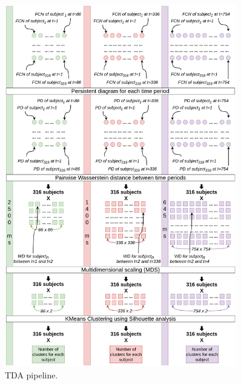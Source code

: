 \begin{figure}[H]%
	\centering	
	\includegraphics[width=0.9\textwidth, trim={0cm, 0.0cm, 0.0cm, 0.0cm}]{figures/tda_pipeline.png}
	\caption{TDA pipeline.}
	\label{fig:tda_pipeline}
\end{figure}

